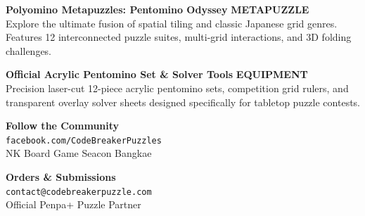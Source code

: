 \documentclass[a4paper, openany, 11pt, twoside]{book}
\begin{document}
\vspace{1.5mm}

\noindent
\begin{tcolorbox}[
  colback=cblight!40!white,
  colframe=cbdarkteal,
  boxrule=0.8pt,
  arc=2mm,
  left=3.5mm, right=3.5mm, top=2.5mm, bottom=2.5mm
]
  \textbf{\color{cbdarkteal}\large Polyomino Metapuzzles: Pentomino Odyssey} \hfill \textbf{\color{cbocean}\footnotesize METAPUZZLE} \\[1.5mm]
  {\small Explore the ultimate fusion of spatial tiling and classic Japanese grid genres. Features 12 interconnected puzzle suites, multi-grid interactions, and 3D folding challenges.}
\end{tcolorbox}

\vspace{1.5mm}

\noindent
\begin{tcolorbox}[
  colback=cblight!40!white,
  colframe=cbdarkteal,
  boxrule=0.8pt,
  arc=2mm,
  left=3.5mm, right=3.5mm, top=2.5mm, bottom=2.5mm
]
  \textbf{\color{cbdarkteal}\large Official Acrylic Pentomino Set \& Solver Tools} \hfill \textbf{\color{cbocean}\footnotesize EQUIPMENT} \\[1.5mm]
  {\small Precision laser-cut 12-piece acrylic pentomino sets, competition grid rulers, and transparent overlay solver sheets designed specifically for tabletop puzzle contests.}
\end{tcolorbox}

\vspace{2.5mm}

\noindent
\begin{tcolorbox}[
  colback=cbdarkteal!10!white,
  colframe=cbdarkteal,
  boxrule=0.8pt,
  arc=2mm,
  left=4mm, right=4mm, top=3mm, bottom=3mm
]
  \begin{minipage}[t]{0.48\linewidth}
    \textbf{\color{cbdarkteal}\normalsize Follow the Community} \\[1.5mm]
    {\small\texttt{facebook.com/CodeBreakerPuzzles}} \\[1mm]
    {\footnotesize NK Board Game Seacon Bangkae}
  \end{minipage}%
  \hfill
  \begin{minipage}[t]{0.48\linewidth}
    \textbf{\color{cbdarkteal}\normalsize Orders \& Submissions} \\[1.5mm]
    {\small\texttt{contact@codebreakerpuzzle.com}} \\[1mm]
    {\footnotesize Official Penpa+ Puzzle Partner}
  \end{minipage}
\end{tcolorbox}
\end{document}
